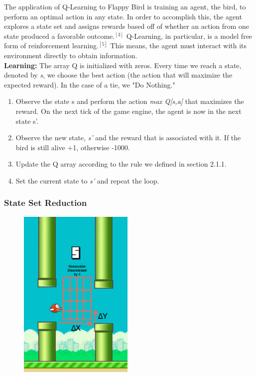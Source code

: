 \documentclass[a4paper, 12pt]{article}
\begin{document}
The application of Q-Learning to Flappy Bird is training an agent, the bird, to perform an optimal action in any state. In order to accomplish this, the agent explores a state set and assigns rewards based off of whether an action from one state produced a favorable outcome.$^{[3]}$ Q-Learning, in particular, is a model free form of reinforcement learning.$^{[5]}$ This means, the agent must interact with its environment directly to obtain information.\\

\noindent\textbf{Learning:}
The array Q is initialized with zeros. Every time we reach a state, denoted by \textit{s}, we choose the best action (the action that will maximize the expected reward). In the case of a tie, we "Do Nothing."
    \begin{enumerate}
    \setlength{\itemsep}{0.2pt}
    \item Observe the state s and perform the action \textit{max Q[s,a]} that maximizes the reward. On the next tick of the game engine, the agent is now in the next state s'.
    \item Observe the new state, \textit{s'} and the reward that is associated with it. If the bird is still alive +1, otherwise -1000.
    \item Update the Q array according to the rule we defined in section 2.1.1.
    \item Set the current state to \textit{s'} and repeat the loop.
    \end{enumerate}

\subsubsection{State Set Reduction}

\setlength{\columnsep}{18pt}
\begin{figure}
    \centering
	\includegraphics[width=5.5cm]{FlappyBirdStateSet.jpg}
\end{figure}
\end{document}
